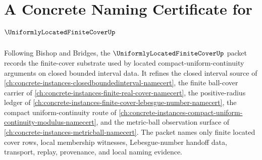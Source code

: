 \chapter{A Concrete Naming Certificate for $\UniformlyLocatedFiniteCoverUp$}
\label{ch:concrete-instances-uniformly-located-finite-cover-namecert}

Following Bishop and Bridges, the $\UniformlyLocatedFiniteCoverUp$ packet records the finite-cover substrate used by located compact-uniform-continuity arguments on closed bounded interval data. It refines the closed interval source of \autoref{ch:concrete-instances-closedboundedinterval-namecert}, the finite ball-cover carrier of \autoref{ch:concrete-instances-finite-real-cover-namecert}, the positive-radius ledger of \autoref{ch:concrete-instances-finite-cover-lebesgue-number-namecert}, the compact uniform-continuity route of \autoref{ch:concrete-instances-compact-uniform-continuity-modulus-namecert}, and the metric-ball observation surface of \autoref{ch:concrete-instances-metricball-namecert}. The packet names only finite located cover rows, local membership witnesses, Lebesgue-number handoff data, transport, replay, provenance, and local naming evidence.

